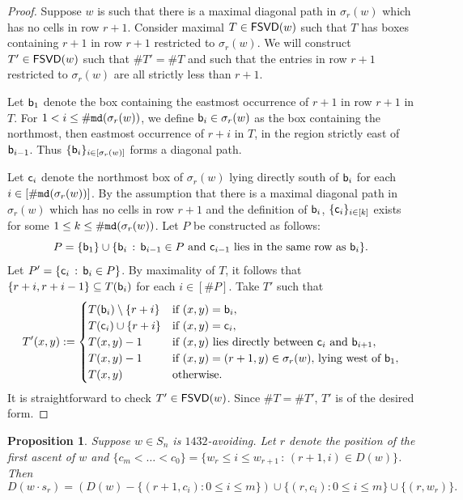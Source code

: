 \documentclass[12pt]{amsart}
\newtheorem{proposition}[theorem]{Proposition}
\theoremstyle{definition}
\theoremstyle{remark}
\numberwithin{equation}{section}
\newcommand \mdCR[1]{{\tt md}(#1)}
\newcommand{\FSVD}{{\sf FSVD}}
\newcommand{\Sym}{S}
\begin{document}
\begin{proof}
Suppose $w$ is such that there is a maximal diagonal path in $\sigma_r(w)$ which has no cells in row $r+1$. Consider maximal $T\in \FSVD(w)$ such that $T$ has boxes containing $r+1$ in row $r+1$ restricted to $\sigma_r(w)$. 
We will construct $T'\in\FSVD(w)$ such that $\#T'=\#T$ and such that the entries in row $r+1$ restricted to $\sigma_r(w)$ are all strictly less than $r+1$.

Let ${\sf b}_1$ denote the box containing the eastmost occurrence of $r+1$ in row $r+1$ in $T$. For $1<i\leq \#\mdCR{\sigma_r(w)}$, we
define ${\sf b}_i\in \sigma_r(w)$ as the box containing the northmost, then eastmost occurrence of $r+i$ in $T$, in the region strictly east of ${\sf b}_{i-1}$. Thus $\{{\sf b}_i\}_{i\in[\sigma_r(w)]}$ forms a diagonal path.



Let ${\sf c}_i$ denote the northmost box of $\sigma_r(w)$ lying directly south of ${\sf b}_i$ for each $i\in[\#\mdCR{\sigma_r(w)}]$. By the assumption that there is a maximal diagonal path in $\sigma_r(w)$ which has no cells in row $r+1$ and the definition of ${\sf b}_i$, $\{{\sf c}_i\}_{i\in [k]}$ exists for some $1\leq k\leq \#\mdCR{\sigma_r(w)}$.
Let $P$ be constructed as follows:
\[P = \{{\sf b}_1\}\cup \{{\sf b}_i \,:  \, {\sf b}_{i-1}\in P \text{ and } {\sf c}_{i-1} \text{ lies in the same row as }  {\sf b}_{i}\}.\]
Let $P'=\{{\sf c}_i \,:  \, {\sf b}_i\in P\}$. 
By maximality of $T$, it follows that $\{r+i,r+i-1\}\subseteq T({\sf b}_{i})$ for each $i\in[\#P]$.
Take $T'$ such that 
 \[T'(x,y):=\begin{cases}
    T({\sf b}_{i})\setminus\{r+i\} &\text{if } (x,y)={\sf b}_{i},\\
     T({\sf c}_{i})\cup\{r+i\} &\text{if } (x,y)={\sf c}_{i},\\
    T(x,y)-1 &\text{if } (x,y)\text{ lies directly between } {\sf c}_{i} \text{ and } {\sf b}_{i+1},\\
    T(x,y)-1 &\text{if } (x,y)=(r+1,y)\in \sigma_r(w) \text{, lying west of } {\sf b}_{1},\\
		T(x,y) &\text{otherwise.}
	\end{cases}\]
It is straightforward to check $T'\in \FSVD(w)$. 
Since $\#T=\#T'$, $T'$ is of the desired form. 
\end{proof}

 \begin{proposition}\label{prop:diag1432Move}
 Suppose $w\in \Sym_n$ is $1432$-avoiding.
 Let $r$ denote the position of the first ascent of $w$ and $\{c_m<\dots<c_0\}=\{w_r\leq i \leq w_{r+1} \,:  \, (r+1,i)\in D(w)\}$. Then 
    \[D(w\cdot s_r)=\left(D(w)- \{ (r+1,c_i):0\leq i\leq m\}\right )\cup \{ (r,c_i):0\leq i\leq m\}\cup \{(r,w_r)\}.\]
 \end{proposition} 
\end{document}

